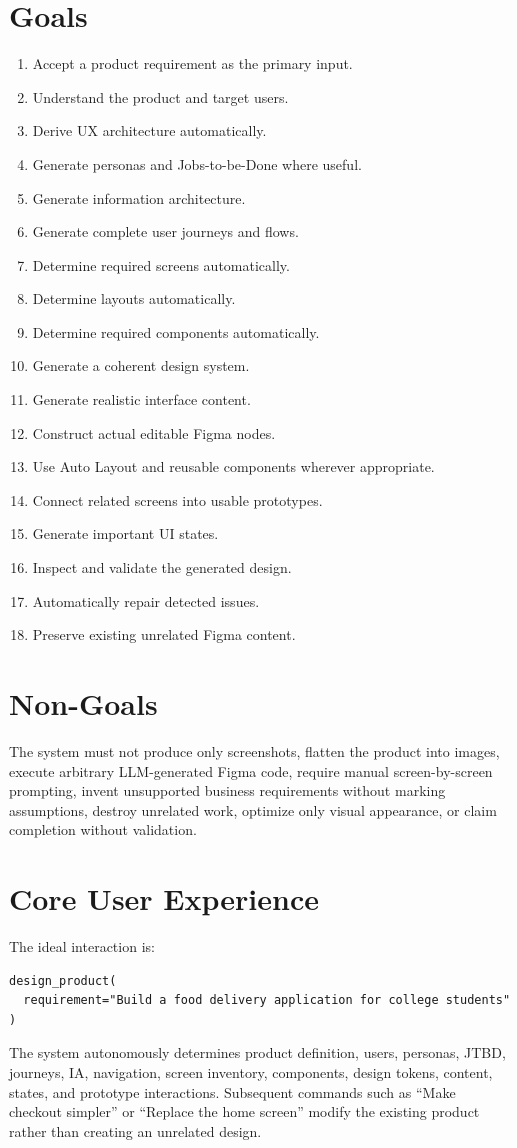 \documentclass[11pt,a4paper]{article}
\begin{document}
\section{Goals}
\begin{enumerate}
\item Accept a product requirement as the primary input.
\item Understand the product and target users.
\item Derive UX architecture automatically.
\item Generate personas and Jobs-to-be-Done where useful.
\item Generate information architecture.
\item Generate complete user journeys and flows.
\item Determine required screens automatically.
\item Determine layouts automatically.
\item Determine required components automatically.
\item Generate a coherent design system.
\item Generate realistic interface content.
\item Construct actual editable Figma nodes.
\item Use Auto Layout and reusable components wherever appropriate.
\item Connect related screens into usable prototypes.
\item Generate important UI states.
\item Inspect and validate the generated design.
\item Automatically repair detected issues.
\item Preserve existing unrelated Figma content.
\end{enumerate}

\section{Non-Goals}
The system must not produce only screenshots, flatten the product into images, execute arbitrary LLM-generated Figma code, require manual screen-by-screen prompting, invent unsupported business requirements without marking assumptions, destroy unrelated work, optimize only visual appearance, or claim completion without validation.

\section{Core User Experience}
The ideal interaction is:
\begin{lstlisting}
design_product(
  requirement="Build a food delivery application for college students"
)
\end{lstlisting}
The system autonomously determines product definition, users, personas, JTBD, journeys, IA, navigation, screen inventory, components, design tokens, content, states, and prototype interactions. Subsequent commands such as ``Make checkout simpler'' or ``Replace the home screen'' modify the existing product rather than creating an unrelated design.
\end{document}
